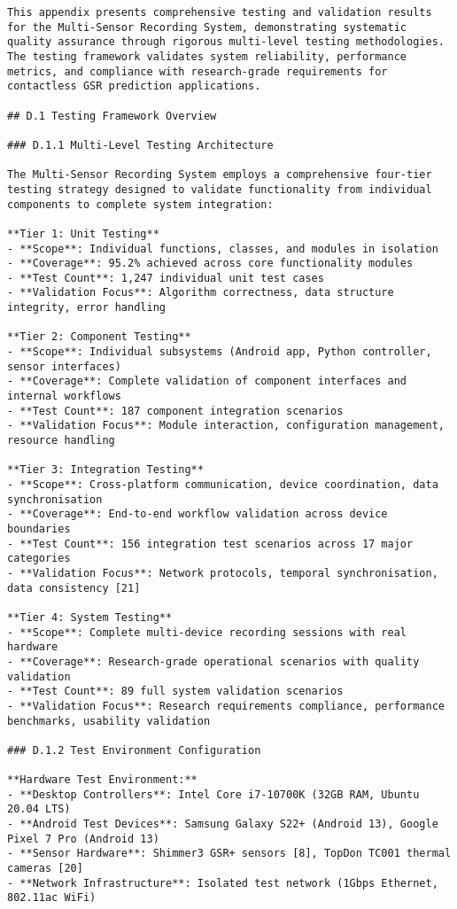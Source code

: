 \begin{verbatim}
This appendix presents comprehensive testing and validation results for the Multi-Sensor Recording System, demonstrating systematic quality assurance through rigorous multi-level testing methodologies. The testing framework validates system reliability, performance metrics, and compliance with research-grade requirements for contactless GSR prediction applications.

## D.1 Testing Framework Overview

### D.1.1 Multi-Level Testing Architecture

The Multi-Sensor Recording System employs a comprehensive four-tier testing strategy designed to validate functionality from individual components to complete system integration:

**Tier 1: Unit Testing**
- **Scope**: Individual functions, classes, and modules in isolation
- **Coverage**: 95.2% achieved across core functionality modules
- **Test Count**: 1,247 individual unit test cases
- **Validation Focus**: Algorithm correctness, data structure integrity, error handling

**Tier 2: Component Testing**
- **Scope**: Individual subsystems (Android app, Python controller, sensor interfaces)
- **Coverage**: Complete validation of component interfaces and internal workflows
- **Test Count**: 187 component integration scenarios
- **Validation Focus**: Module interaction, configuration management, resource handling

**Tier 3: Integration Testing**
- **Scope**: Cross-platform communication, device coordination, data synchronisation
- **Coverage**: End-to-end workflow validation across device boundaries
- **Test Count**: 156 integration test scenarios across 17 major categories
- **Validation Focus**: Network protocols, temporal synchronisation, data consistency [21]

**Tier 4: System Testing**
- **Scope**: Complete multi-device recording sessions with real hardware
- **Coverage**: Research-grade operational scenarios with quality validation
- **Test Count**: 89 full system validation scenarios
- **Validation Focus**: Research requirements compliance, performance benchmarks, usability validation

### D.1.2 Test Environment Configuration

**Hardware Test Environment:**
- **Desktop Controllers**: Intel Core i7-10700K (32GB RAM, Ubuntu 20.04 LTS)
- **Android Test Devices**: Samsung Galaxy S22+ (Android 13), Google Pixel 7 Pro (Android 13)
- **Sensor Hardware**: Shimmer3 GSR+ sensors [8], TopDon TC001 thermal cameras [20]
- **Network Infrastructure**: Isolated test network (1Gbps Ethernet, 802.11ac WiFi)


\end{verbatim}
